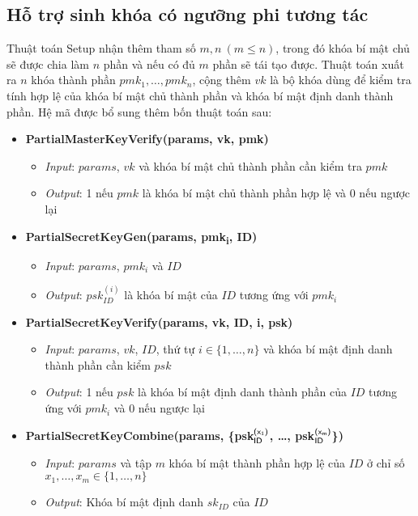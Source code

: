 \documentclass[class=report, crop=false]{standalone}
\begin{document}
		\subsection{Hỗ trợ sinh khóa có ngưỡng phi tương tác}
			Thuật toán \textsf{Setup} nhận thêm tham số $m, n \ (m \leq n)$, trong đó khóa bí mật chủ sẽ được chia làm $n$ phần và nếu có đủ $m$ phần sẽ tái tạo được. Thuật toán xuất ra $n$ khóa thành phần $pmk_1, \dots, pmk_n$, cộng thêm $vk$ là bộ khóa dùng để kiểm tra tính hợp lệ của khóa bí mật chủ thành phần và khóa bí mật định danh thành phần. Hệ mã được bổ sung thêm bốn thuật toán sau:
			\vspace{-0.5cm}
			\begin{itemize}
				\item[] {\sffamily\bfseries PartialMasterKeyVerify(params, vk, pmk)}
				\begin{itemize}
					\item[\textbullet] \textit{Input}: $params$, $vk$ và khóa bí mật chủ thành phần cần kiểm tra $pmk$
					\item[\textbullet] \textit{Output}: 1 nếu $pmk$ là khóa bí mật chủ thành phần hợp lệ và 0 nếu ngược lại
				\end{itemize}
				\item[] {\sffamily\bfseries PartialSecretKeyGen(params, pmk\textsubscript{i}, ID)}
				\begin{itemize}
					\item[\textbullet] \textit{Input}: $params$, $pmk_i$ và $ID$
					\item[\textbullet] \textit{Output}: $psk_{ID}^{(i)}$ là khóa bí mật của $ID$ tương ứng với $pmk_i$
				\end{itemize}
				\item[] {\sffamily\bfseries PartialSecretKeyVerify(params, vk, ID, i, psk)}
				\begin{itemize}
					\item[\textbullet] \textit{Input}: $params$, $vk$, $ID$, thứ tự $i \in \{1, \dots, n \}$ và khóa bí mật định danh thành phần cần kiểm $psk$
					\item[\textbullet] \textit{Output}: 1 nếu $psk$ là khóa bí mật định danh thành phần của $ID$ tương ứng với $pmk_i$ và 0 nếu ngược lại
				\end{itemize}
				\newpage
				\item[] {\sffamily\bfseries PartialSecretKeyCombine(params, \{psk$_{\textsf{ID}}^{\textsf{(x\textsubscript{1})}}$, \dots, psk$_{\textsf{ID}}^{\textsf{(x\textsubscript{m})}}$\})}
				\begin{itemize}
					\item[\textbullet] \textit{Input}: $params$ và tập $m$ khóa bí mật thành phần hợp lệ của $ID$ ở chỉ số $x_1, \dots, x_m \in \{1, \dots, n \}$
					\item[\textbullet] \textit{Output}: Khóa bí mật định danh $sk_{ID}$ của $ID$
				\end{itemize}
			\end{itemize}
			
\end{document}
